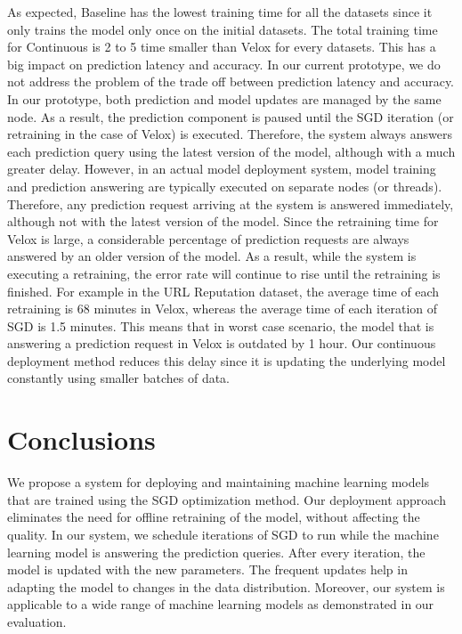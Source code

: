 \documentclass[10pt,conference,letterpaper]{IEEEtran}
\begin{document}
As expected, Baseline has the lowest training time for all the datasets since it only trains the model only once on the initial datasets.
The total training time for Continuous is 2 to 5 time smaller than Velox for every datasets.
This has a big impact on prediction latency and accuracy.
In our current prototype, we do not address the problem of the trade off between prediction latency and accuracy.
In our prototype, both prediction and model updates are managed by the same node.
As a result, the prediction component is paused until the SGD iteration (or retraining in the case of Velox) is executed.
Therefore, the system always answers each prediction query using the latest version of the model, although with a much greater delay.
However, in an actual model deployment system, model training and prediction answering are typically executed on separate nodes (or threads).
Therefore, any prediction request arriving at the system is answered immediately, although not with the latest version of the model.
Since the retraining time for Velox is large, a considerable percentage of prediction requests are always answered by an older version of the model.
As a result, while the system is executing a retraining, the error rate will continue to rise until the retraining is finished.
For example in the URL Reputation dataset, the average time of each retraining is 68 minutes in Velox, whereas the average time of each iteration of SGD is 1.5 minutes.
This means that in worst case scenario, the model that is answering a prediction request in Velox is outdated by 1 hour.
Our continuous deployment method reduces this delay since it is updating the underlying model constantly using smaller batches of data.

\section{Conclusions} \label{conclusion}
We propose a system for deploying and maintaining machine learning models that are trained using the SGD optimization method.
Our deployment approach eliminates the need for offline retraining of the model, without affecting the quality.
In our system, we schedule iterations of SGD to run while the machine learning model is answering the prediction queries.
After every iteration, the model is updated with the new parameters.
The frequent updates help in adapting the model to changes in the data distribution.
Moreover, our system is applicable to a wide range of machine learning models as demonstrated in our evaluation.
\end{document}
